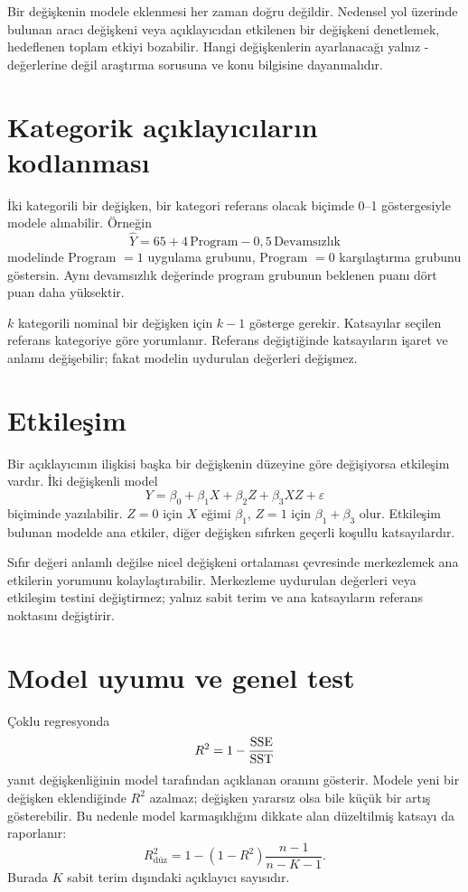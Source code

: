 Bir değişkenin modele eklenmesi her zaman doğru değildir. Nedensel yol üzerinde
bulunan aracı değişkeni veya açıklayıcıdan etkilenen bir değişkeni denetlemek,
hedeflenen toplam etkiyi bozabilir. Hangi değişkenlerin ayarlanacağı yalnız
\pval-değerlerine değil araştırma sorusuna ve konu bilgisine dayanmalıdır.

\section{Kategorik açıklayıcıların kodlanması}
\label{sec:indicator-coding}

İki kategorili bir değişken, bir kategori referans olacak biçimde 0--1
göstergesiyle modele alınabilir. Örneğin
\[
\widehat{Y}=65+4\,\text{Program}-0{,}5\,\text{Devamsızlık}
\]
modelinde Program $=1$ uygulama grubunu, Program $=0$ karşılaştırma grubunu
göstersin. Aynı devamsızlık değerinde program grubunun beklenen puanı dört
puan daha yüksektir.

$k$ kategorili nominal bir değişken için $k-1$ gösterge gerekir. Katsayılar
seçilen referans kategoriye göre yorumlanır. Referans değiştiğinde
katsayıların işaret ve anlamı değişebilir; fakat modelin uydurulan değerleri
değişmez.

\section{Etkileşim}
\label{sec:interaction}

Bir açıklayıcının ilişkisi başka bir değişkenin düzeyine göre değişiyorsa
etkileşim vardır. İki değişkenli model
\[
Y=\beta_0+\beta_1X+\beta_2Z+\beta_3XZ+\varepsilon
\]
biçiminde yazılabilir. $Z=0$ için $X$ eğimi $\beta_1$, $Z=1$ için
$\beta_1+\beta_3$ olur. Etkileşim bulunan modelde ana etkiler, diğer değişken
sıfırken geçerli koşullu katsayılardır.

Sıfır değeri anlamlı değilse nicel değişkeni ortalaması çevresinde merkezlemek
ana etkilerin yorumunu kolaylaştırabilir. Merkezleme uydurulan değerleri veya
etkileşim testini değiştirmez; yalnız sabit terim ve ana katsayıların referans
noktasını değiştirir.

\section{Model uyumu ve genel test}
\label{sec:multiple-fit}

Çoklu regresyonda
\[
R^2=1-\frac{\operatorname{SSE}}{\operatorname{SST}}
\]
yanıt değişkenliğinin model tarafından açıklanan oranını gösterir. Modele yeni
bir değişken eklendiğinde $R^2$ azalmaz; değişken yararsız olsa bile küçük bir
artış gösterebilir. Bu nedenle model karmaşıklığını dikkate alan düzeltilmiş
katsayı da raporlanır:
\[
R^2_{\mathrm{düz}}
=1-(1-R^2)\frac{n-1}{n-K-1}.
\]
Burada $K$ sabit terim dışındaki açıklayıcı sayısıdır.

